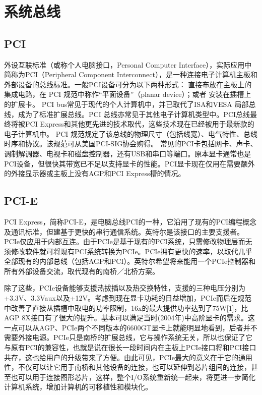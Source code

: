 \section{系统总线} 

\subsection{PCI}
外设互联标准（或称个人电脑接口，Personal Computer Interface），实际应用中简称为PCI（Peripheral Component Interconnect），是一种连接电子计算机主板和外部设备的总线标准。一般PCI设备可分为以下两种形式：
直接布放在主板上的集成电路，在 PCI 规范中称作“平面设备”（planar device）；或者
安装在插槽上的扩展卡。
PCI bus常见于现代的个人计算机中，并已取代了ISA和VESA 局部总线，成为了标准扩展总线。PCI 总线亦常见于其他电子计算机类型中。PCI总线最终将被PCI Express和其他更先进的技术取代，这些技术现在已经被用于最新款的电子计算机中。
PCI 规范规定了该总线的物理尺寸（包括线宽）、电气特性、总线时序和协议。该规范可从美国PCI-SIG协会购得。
常见的PCI卡包括网卡、声卡、调制解调器、电视卡和磁盘控制器，还有USB和串口等端口。原本显卡通常也是PCI设备，但很快其带宽已不足以支持显卡的性能。PCI显卡现在仅用在需要额外的外接显示器或主板上没有AGP和PCI Express槽的情况。

\subsection{PCI-E}
PCI Express，简称PCI-E，是电脑总线PCI的一种，它沿用了现有的PCI编程概念及通讯标准，但建基于更快的串行通信系统。英特尔是该接口的主要支援者。PCIe仅应用于内部互连。由于PCIe是基于现有的PCI系统，只需修改物理层而无须修改软件就可将现有PCI系统转换为PCIe。PCIe拥有更快的速率，以取代几乎全部现有的内部总线（包括AGP和PCI）。英特尔希望将来能用一个PCIe控制器和所有外部设备交流，取代现有的南桥／北桥方案。

除了这些，PCIe设备能够支援热拔插以及热交换特性，支援的三种电压分别为+3.3V、3.3Vaux以及+12V。考虑到现在显卡功耗的日益增加，PCIe而后在规范中改善了直接从插槽中取电的功率限制，16x的最大提供功率达到了75W[1]，比AGP 8X接口有了很大的提升。基本可以满足当时(2004年)中高阶显卡的需求。这一点可以从AGP、PCIe两个不同版本的6600GT显卡上就能明显地看到，后者并不需要外接电源。PCIe只是南桥的扩展总线，它与操作系统无关，所以也保证了它与原有PCI的兼容性，也就是说在很长一段时间内在主板上PCIe接口将和PCI接口共存，这也给用户的升级带来了方便。由此可见，PCIe最大的意义在于它的通用性，不仅可以让它用于南桥和其他设备的连接，也可以延伸到芯片组间的连接，甚至也可以用于连接图形芯片，这样，整个I/O系统重新统一起来，将更进一步简化计算机系统，增加计算机的可移植性和模块化。


